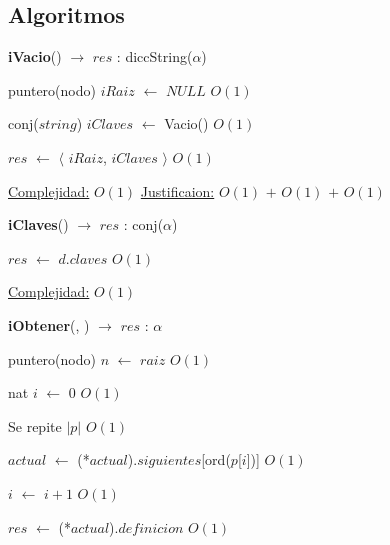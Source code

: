 \begin{Algoritmos}
\subsection{Algoritmos}

\begin{algorithm}[H]
{\textbf{iVacio}() $\to$ $res$ : diccString($\alpha$)}
\begin{algorithmic}[1]

\State puntero(nodo) $iRaiz$ $\gets $ $NULL$  \Comment $O(1)$

\State conj($string$) $iClaves$ $\gets$ Vacio() \Comment $O(1)$

\State $res$ $\gets$  $\langle$ $iRaiz$, $iClaves$ $\rangle$ \Comment $O(1)$

\medskip
\State \underline{Complejidad:} $O(1)$
\State \underline{Justificaion:} $O(1)$ $+$ $O(1)$ $+$ $O(1)$

\end{algorithmic}
\end{algorithm}

\begin{algorithm}[H]
{\textbf{iClaves}(}) $\to$ $res$ : conj($\alpha$)
\begin{algorithmic}[1]

\State $res$ $\gets$ $d$.$claves$ \Comment $O(1)$

\medskip
\State \underline{Complejidad:} $O(1)$

\end{algorithmic}
\end{algorithm}



\begin{algorithm}[H]
{\textbf{iObtener}(, }) $\to$ $res$ : $\alpha$
\begin{algorithmic}[1]

\State puntero(nodo) $n$ $\gets$ $raiz$ \Comment $O(1)$

\State nat $i$ $\gets$ $0$ \Comment $O(1)$


   \Comment Se repite $|p|$ $O(1)$


	\State $actual$ $\gets$ (*$actual$).$siguientes$[ord($p$[$i$])] \Comment $O(1)$

	\State $i$ $\gets$ $i + 1$ \Comment $O(1)$
\EndWhile


\State $res$ $\gets$ (*$actual$).$definicion$ \Comment $O(1)$


\end{algorithmic}
\end{algorithm}
\end{Algoritmos}

